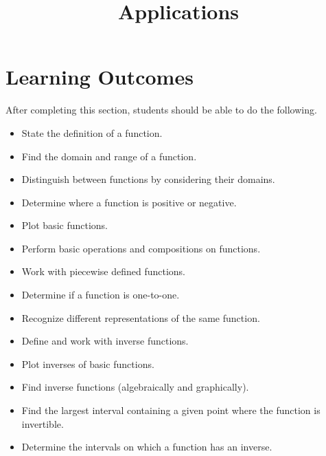 \documentclass{ximera}
\title{Applications}
\begin{document}
\begin{abstract}

\end{abstract}
 
\maketitle
 
\section*{Learning Outcomes}
After completing this section, students should be able to do the following.
 
\begin{itemize}
    \item State the definition of a function.
    \item Find the domain and range of a function.
    \item Distinguish between functions by considering their domains.
    \item Determine where a function is positive or negative.
    \item Plot basic functions.
        \item Perform basic operations and compositions on
          functions.
        \item Work with piecewise defined functions.
    \item Determine if a function is one-to-one.
    \item Recognize different representations of the same function.
        \item Define and work with inverse functions.
        \item Plot inverses of basic functions.
    \item Find inverse functions (algebraically and graphically).
        \item Find the largest interval containing a given point
          where the function is invertible.
    \item Determine the intervals on which a function has an inverse.
 
\end{itemize}

 
\end{document}
